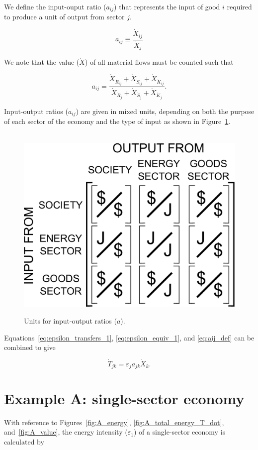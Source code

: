 We define the input-ouput ratio ($a_{ij}$)
that represents the input 
of good $i$ required to produce a unit of output from sector $j$.

\begin{equation} \label{eq:aij_def}
	a_{ij} \equiv \frac{\dot{X}_{ij}}{\dot{X}_{j}}
\end{equation}

We note that the value ($\dot{X}$) of all material flows must be counted such that

\begin{equation} \label{eq:aij_def_expanded}
	a_{ij} =	 
	\frac{\dot{X}_{\dot{R}_{ij}} + \dot{X}_{\dot{S}_{ij}} + \dot{X}_{\dot{K}_{ij}}}
		{\dot{X}_{\dot{R}_{j}} + \dot{X}_{\dot{S}_{j}} + \dot{X}_{\dot{K}_{j}}}.
\end{equation}

Input-output ratios ($a_{ij}$) are given in mixed units, 
depending on both the purpose of each sector of the economy 
and the type of input as shown in Figure~\ref{fig:A_matrix_units}.

\begin{figure}[h!]
\centering\
\includegraphics[width=0.4\linewidth]{Part_2/Chapter_Intensity/images/I-O_units.pdf}
\caption[Units for input-output ratios]{ Units for input-output ratios ($a$).}
\label{fig:A_matrix_units}
\end{figure}

Equations~\ref{eq:epsilon_transfers_1}, 
\ref{eq:epsilon_equiv_1}, and 
\ref{eq:aij_def} can be combined to give

\begin{equation}
	\dot{T}_{jk} = \varepsilon_{j} a_{jk} \dot{X}_{k}.
\end{equation}


\section{Example A: single-sector economy} %

With reference to Figures~\ref{fig:A_energy}, 
\ref{fig:A_total_energy_T_dot}, 
and~\ref{fig:A_value},
the energy intensity ($\varepsilon_{1}$) of a single-sector economy is calculated by

